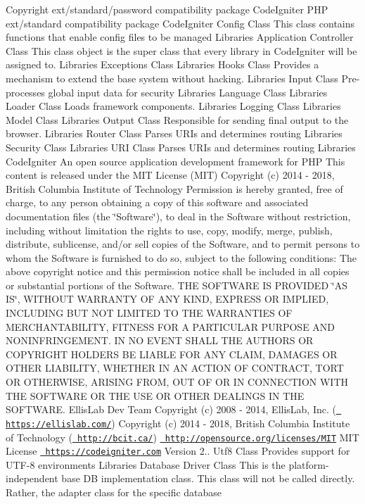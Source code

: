 \begin{DoxyCopyright}{Copyright}
ext/standard/password compatibility package  Code\+Igniter P\+HP ext/standard compatibility package  Code\+Igniter Config Class This class contains functions that enable config files to be managed  Libraries Application Controller Class This class object is the super class that every library in Code\+Igniter will be assigned to.  Libraries Exceptions Class  Libraries Hooks Class Provides a mechanism to extend the base system without hacking.  Libraries Input Class Pre-\/processes global input data for security  Libraries Language Class  Libraries Loader Class Loads framework components.  Libraries Logging Class  Libraries Model Class  Libraries Output Class Responsible for sending final output to the browser.  Libraries Router Class Parses U\+R\+Is and determines routing  Libraries Security Class  Libraries U\+RI Class Parses U\+R\+Is and determines routing  Libraries Code\+Igniter An open source application development framework for P\+HP This content is released under the M\+IT License (M\+IT) Copyright (c) 2014 -\/ 2018, British Columbia Institute of Technology Permission is hereby granted, free of charge, to any person obtaining a copy of this software and associated documentation files (the \char`\"{}\+Software\char`\"{}), to deal in the Software without restriction, including without limitation the rights to use, copy, modify, merge, publish, distribute, sublicense, and/or sell copies of the Software, and to permit persons to whom the Software is furnished to do so, subject to the following conditions\+: The above copyright notice and this permission notice shall be included in all copies or substantial portions of the Software. T\+HE S\+O\+F\+T\+W\+A\+RE IS P\+R\+O\+V\+I\+D\+ED \char`\"{}\+A\+S I\+S\char`\"{}, W\+I\+T\+H\+O\+UT W\+A\+R\+R\+A\+N\+TY OF A\+NY K\+I\+ND, E\+X\+P\+R\+E\+SS OR I\+M\+P\+L\+I\+ED, I\+N\+C\+L\+U\+D\+I\+NG B\+UT N\+OT L\+I\+M\+I\+T\+ED TO T\+HE W\+A\+R\+R\+A\+N\+T\+I\+ES OF M\+E\+R\+C\+H\+A\+N\+T\+A\+B\+I\+L\+I\+TY, F\+I\+T\+N\+E\+SS F\+OR A P\+A\+R\+T\+I\+C\+U\+L\+AR P\+U\+R\+P\+O\+SE A\+ND N\+O\+N\+I\+N\+F\+R\+I\+N\+G\+E\+M\+E\+NT. IN NO E\+V\+E\+NT S\+H\+A\+LL T\+HE A\+U\+T\+H\+O\+RS OR C\+O\+P\+Y\+R\+I\+G\+HT H\+O\+L\+D\+E\+RS BE L\+I\+A\+B\+LE F\+OR A\+NY C\+L\+A\+IM, D\+A\+M\+A\+G\+ES OR O\+T\+H\+ER L\+I\+A\+B\+I\+L\+I\+TY, W\+H\+E\+T\+H\+ER IN AN A\+C\+T\+I\+ON OF C\+O\+N\+T\+R\+A\+CT, T\+O\+RT OR O\+T\+H\+E\+R\+W\+I\+SE, A\+R\+I\+S\+I\+NG F\+R\+OM, O\+UT OF OR IN C\+O\+N\+N\+E\+C\+T\+I\+ON W\+I\+TH T\+HE S\+O\+F\+T\+W\+A\+RE OR T\+HE U\+SE OR O\+T\+H\+ER D\+E\+A\+L\+I\+N\+GS IN T\+HE S\+O\+F\+T\+W\+A\+RE.  Ellis\+Lab Dev Team  Copyright (c) 2008 -\/ 2014, Ellis\+Lab, Inc. (\href{https://ellislab.com/}{\texttt{ https\+://ellislab.\+com/}})  Copyright (c) 2014 -\/ 2018, British Columbia Institute of Technology (\href{http://bcit.ca/}{\texttt{ http\+://bcit.\+ca/}})  \href{http://opensource.org/licenses/MIT}{\texttt{ http\+://opensource.\+org/licenses/\+M\+IT}} M\+IT License  \href{https://codeigniter.com}{\texttt{ https\+://codeigniter.\+com}}  Version 2..  Utf8 Class Provides support for U\+T\+F-\/8 environments  Libraries Database Driver Class This is the platform-\/independent base DB implementation class. This class will not be called directly. Rather, the adapter class for the specific database 
\end{DoxyCopyright}
